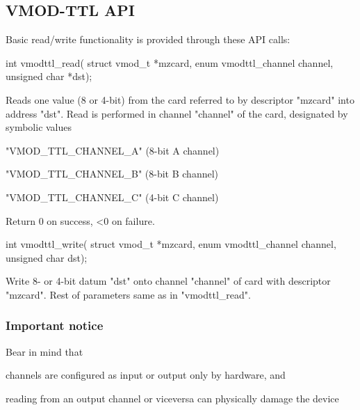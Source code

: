 \documentclass[11pt,a4paper]{article}
\begin{document}
\subsection{VMOD-TTL API}

Basic read/write functionality is provided through these API calls:

\begin{proto}
int vmodttl_read(
	struct vmod_t *mzcard, enum vmodttl_channel channel, 
	unsigned char *dst);
\end{proto}

Reads one value (8 or 4-bit) from the card referred to by descriptor "mzcard" into 
address "dst". Read is performed in channel "channel" of the card,  
designated by symbolic values
\begin{compactitem}
   \item	"VMOD_TTL_CHANNEL_A" (8-bit A channel)
   \item	"VMOD_TTL_CHANNEL_B" (8-bit B channel)
   \item	"VMOD_TTL_CHANNEL_C" (4-bit C channel)
\end{compactitem}
Return 0 on success, <0 on failure.

\begin{proto}
int vmodttl_write(
	struct vmod_t *mzcard, enum vmodttl_channel channel, 
	unsigned char dst);
\end{proto}
Write 8- or 4-bit datum "dst" onto channel "channel" of card with
descriptor "mzcard". Rest of parameters same as in "vmodttl_read".

\subsubsection*{Important notice}
Bear in mind that
\begin{compactitem}
\item channels are configured as input or output only by hardware,  and
\item reading from an output channel or viceversa can physically damage
    the device
\end{compactitem}
\end{document}
